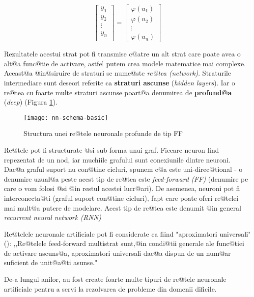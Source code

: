 $$
\begin{bmatrix}
		y_1 \\
		y_2 \\
		\vdots \\ 
		y_n \\
	\end{bmatrix}	
	=
	\begin{bmatrix}
		\varphi (u_1)\\
		\varphi	(u_2) \\
		\vdots \\
		\varphi (u_n)
	\end{bmatrix}
$$

Rezultatele acestui strat pot fi transmise c@atre un alt strat care poate avea o alt@a func@tie de activare, astfel putem crea modele matematice mai complexe. Aceast@a @in@siruire de straturi se nume@ste {\sl re@tea (network)}. Straturile intermediare sunt deseori referite ca \textbf{straturi ascunse} (\textsl{hidden layers}). Iar o re@tea cu foarte multe straturi ascunse poart@a denumirea de \textbf{profund@a} (\textsl{deep}) (Figura \ref{nn:schema-basic}).

\begin{figure}[h]
	\centering
	\texttt{[image: nn-schema-basic]}
	\caption{Structura unei re@tele neuronale profunde de tip FF}
	\label{nn:schema-basic}
\end{figure}


Re@tele pot fi structurate @si sub forma unui graf. Fiecare neuron find repezentat de un nod, iar muchiile grafului sunt conexiunile dintre neuroni. Dac@a graful suport nu con@tine cicluri, spunem c@a este uni-direc@tional - o denumire uzual@a peste acest tip de re@tea este {\sl feed-forward (FF)} (denumire pe care o vom folosi @si @in restul acestei lucr@ari). De asemenea, neuroni pot fi interconecta@ti (graful suport con@tine cicluri), fapt care poate oferi re@telei mai mult@a putere de modelare. Acest tip de re@tea este denumit @in general {\sl recurrent neural network (RNN)}

Re@telele neuronale artificiale pot fi considerate ca fiind "aproximatori universali"(\cite{hornik-nn}): ,,Re@telele feed-forward multistrat sunt,@in condi@tii generale ale func@tiei de activare ascuns@a, aproximatori universali dac@a dispun de un num@ar suficient de unit@a@ti asunse."

De-a lungul anilor, au fost create foarte multe tipuri de re@tele neuronale artificiale pentru a servi la rezolvarea de probleme din domenii dificile.

